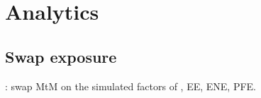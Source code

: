 \section{Analytics}\label{sec:arch-analytics}

\subsection{Swap exposure}\label{sec:arch-exposure}
: swap MtM on the simulated factors of , EE, ENE, PFE.

\pending

